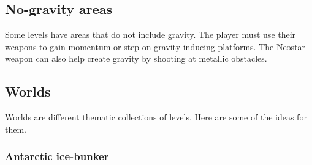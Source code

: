 \documentclass[../Main.tex]{subfiles}
\begin{document}
\subsection{No-gravity areas}

Some levels have areas that do not include gravity. The player must use their weapons to gain momentum or step on gravity-inducing platforms. The Neostar weapon can also help create gravity by shooting at metallic obstacles. 

\subsection{Worlds}

Worlds are different thematic collections of levels. Here are some of the ideas for them.

\subsubsection{Antarctic ice-bunker}
\end{document}
